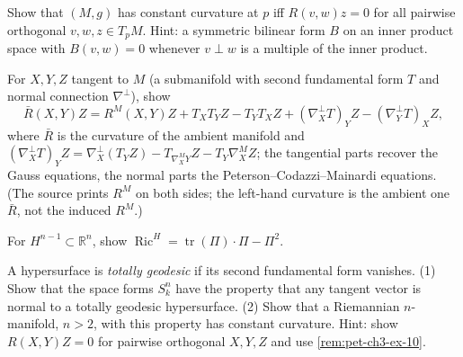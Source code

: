 \begin{remark}
  \label{rem:pet-ch3-ex-10}
  \leanok
  Show that $(M,g)$ has constant curvature at $p$ iff $R(v,w)z=0$ for all pairwise
  orthogonal $v,w,z\in T_pM$. Hint: a symmetric bilinear form $B$ on an inner
  product space with $B(v,w)=0$ whenever $v\perp w$ is a multiple of the inner
  product.
\end{remark}

\begin{remark}
  \label{rem:pet-ch3-ex-11}
  \leanok
  For $X,Y,Z$ tangent to $M$ (a submanifold with second fundamental form $T$ and
  normal connection $\nabla^\perp$), show
  \[
    \bar R(X,Y)Z=R^M(X,Y)Z+T_XT_YZ-T_YT_XZ+(\nabla^\perp_XT)_YZ-(\nabla^\perp_YT)_XZ,
  \]
  where $\bar R$ is the curvature of the ambient manifold and
  $(\nabla^\perp_XT)_YZ=\nabla^\perp_X(T_YZ)-T_{\nabla^M_XY}Z-T_Y\nabla^M_XZ$;
  the tangential parts recover the Gauss equations, the normal parts the
  Peterson--Codazzi--Mainardi equations. (The source prints $R^M$ on both sides;
  the left-hand curvature is the ambient one $\bar R$, not the induced $R^M$.)
\end{remark}

\begin{remark}
  \label{rem:pet-ch3-ex-12}
  \leanok
  For $H^{n-1}\subset\mathbb R^n$, show
  $\operatorname{Ric}^H=\operatorname{tr}(\Pi)\cdot\Pi-\Pi^2$.
\end{remark}

\begin{remark}
  \label{rem:pet-ch3-ex-13}
  \leanok
  A hypersurface is \emph{totally geodesic} if its second fundamental form
  vanishes. (1) Show that the space forms $S^n_k$ have the property that any
  tangent vector is normal to a totally geodesic hypersurface. (2) Show that a
  Riemannian $n$-manifold, $n>2$, with this property has constant curvature.
  Hint: show $R(X,Y)Z=0$ for pairwise orthogonal $X,Y,Z$ and use
  \cref{rem:pet-ch3-ex-10}.
\end{remark}

